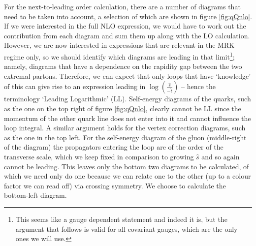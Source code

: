 For the next-to-leading order calculation, there are a number of diagrams that need to be taken into account, a selection of which are shown in figure \ref{fig:qQnlo}. If we were interested in the full NLO expression, we would have to work out the contribution from each diagram and sum them up along with the LO calculation. However, we are now interested in expressions that are relevant in the MRK regime only, so we should identify which diagrams are leading in that limit\footnote{This seems like a gauge dependent statement and indeed it is, but the argument that follows is valid for all covariant gauges, which are the only ones we will use.}; namely, diagrams that have a dependence on the rapidity gap between the two extremal partons. Therefore, we can expect that only loops that have `knowledge' of this can give rise to an expression leading in $\log(\frac{\hat{s}}{-\hat{t}})$ -- hence the terminology `Leading Logarithmic' (LL). Self-energy diagrams of the quarks, such as the one on the top right of figure \ref{fig:qQnlo}, clearly cannot be LL since the momentum of the other quark line does not enter into it and cannot influence the loop integral. A similar argument holds for the vertex correction diagrams, such as the one in the top left. For the self-energy diagram of the gluon (middle-right of the diagram) the propagators entering the loop are of the order of the transverse scale, which we keep fixed in comparison to growing $\hat{s}$ and so again cannot be leading. This leaves only the bottom two diagrams to be calculated, of which we need only do one because we can relate one to the other (up to a colour factor we can read off) via crossing symmetry. We choose to calculate the bottom-left diagram.


